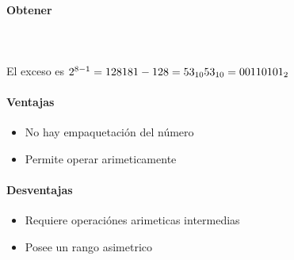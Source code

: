 \paragraph{Obtener}\mbox{}\\\\
El exceso es $2^{8-1}=128\\
181-128 = 53_{10}\\
53_{10} = 00110101_{2}$

\paragraph{Ventajas}
\begin{itemize}
\item No hay empaquetación del número 
\item Permite operar arimeticamente
\end{itemize}

\paragraph{Desventajas}
\begin{itemize}
\item Requiere operaciónes arimeticas intermedias
\item Posee un rango asimetrico
\end{itemize}



